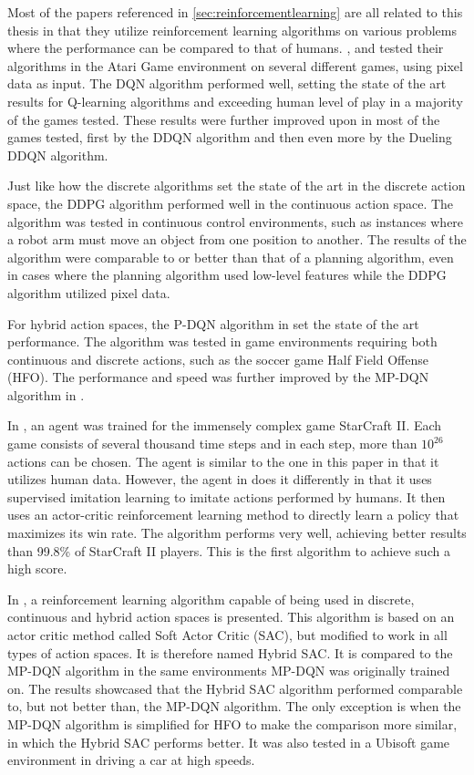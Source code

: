 \documentclass{kththesis}
\begin{document}
Most of the papers referenced in \autoref{sec:reinforcementlearning} are all related to this thesis in that they utilize reinforcement learning algorithms on various problems where the performance can be compared to that of humans. \textcite{mnih2015human}, \textcite{van2016deep} and \textcite{wang2015dueling} tested their algorithms in the Atari Game environment on several different games, using pixel data as input. The DQN algorithm performed well, setting the state of the art results for Q-learning algorithms and exceeding human level of play in a majority of the games tested. These results were further improved upon in most of the games tested, first by the DDQN algorithm and then even more by the Dueling DDQN algorithm. 

Just like how the discrete algorithms set the state of the art in the discrete action space, the DDPG algorithm performed well in the continuous action space. The algorithm was tested in continuous control environments, such as instances where a robot arm must move an object from one position to another. The results of the algorithm were comparable to or better than that of a planning algorithm, even in cases where the planning algorithm used low-level features while the DDPG algorithm utilized pixel data. \parencite{lillicrap2015continuous}

For hybrid action spaces, the P-DQN algorithm in \textcite{xiong2018parametrized} set the state of the art performance. The algorithm was tested in game environments requiring both continuous and discrete actions, such as the soccer game Half Field Offense (HFO). The performance and speed was further improved by the MP-DQN algorithm in \textcite{bester2019mpdqn}.

In \textcite{vinyals2019grandmaster}, an agent was trained for the immensely complex game StarCraft II. Each game consists of several thousand time steps and in each step, more than $10^{26}$ actions can be chosen. The agent is similar to the one in this paper in that it utilizes human data. However, the agent in \textcite{vinyals2019grandmaster} does it differently in that it uses supervised imitation learning to imitate actions performed by humans. It then uses an actor-critic reinforcement learning method to directly learn a policy that maximizes its win rate. The algorithm performs very well, achieving better results than 99.8\% of StarCraft II players. This is the first algorithm to achieve such a high score.

In \textcite{delalleau2019discrete}, a reinforcement learning algorithm capable of being used in discrete, continuous and hybrid action spaces is presented. This algorithm is based on an actor critic method called Soft Actor Critic (SAC), but modified to work in all types of action spaces. It is therefore named Hybrid SAC. It is compared to the MP-DQN algorithm in the same environments MP-DQN was originally trained on. The results showcased that the Hybrid SAC algorithm performed comparable to, but not better than, the MP-DQN algorithm. The only exception is when the MP-DQN algorithm is simplified for HFO to make the comparison more similar, in which the Hybrid SAC performs better. It was also tested in a Ubisoft game environment in driving a car at high speeds.
\end{document}
